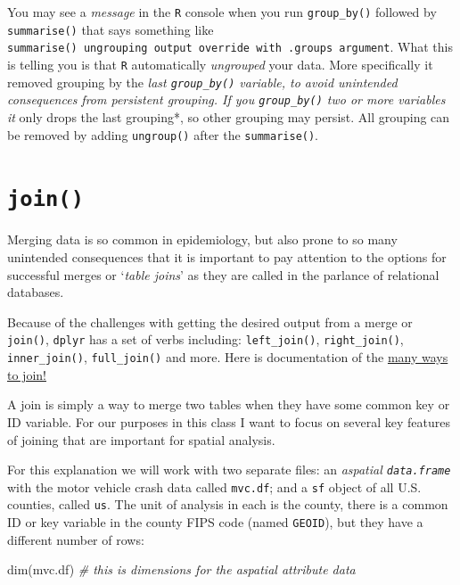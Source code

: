 \documentclass[
]{book}
\newenvironment{Shaded}{\begin{snugshade}}{\end{snugshade}}
\newcommand{\CommentTok}[1]{\textcolor[rgb]{0.56,0.35,0.01}{\textit{#1}}}
\newcommand{\FunctionTok}[1]{\textcolor[rgb]{0.00,0.00,0.00}{#1}}
\newcommand{\NormalTok}[1]{#1}
\newenvironment{rmdnote}[1]
  {
  \begin{itemize}
  \renewcommand{\labelitemi}{
    \raisebox{-.7\height}[0pt][0pt]{
      {\setkeys{Gin}{width=3em,keepaspectratio}\texttt{[image: images/\#1]}}
    }
  }
  \setlength{\fboxsep}{1em}
  \begin{note}
  \item
  }
  {
  \end{note}
  \end{itemize}
  }
\begin{document}
\begin{rmdnote}{note}
You may see a \emph{message} in the \texttt{R} console when you run \texttt{group\_by()} followed by \texttt{summarise()} that says something like \texttt{summarise()\ ungrouping\ output\ override\ with\ .groups\ argument}. What this is telling you is that \texttt{R} automatically \emph{ungrouped} your data. More specifically it removed grouping by the \emph{last \texttt{group\_by()} variable, to avoid unintended consequences from persistent grouping. If you \texttt{group\_by()} two or more variables it }only drops the last grouping*, so other grouping may persist. All grouping can be removed by adding \texttt{ungroup()} after the \texttt{summarise()}.

\end{rmdnote}

\hypertarget{join}{%
\section{\texorpdfstring{\texttt{join()}}{join()}}\label{join}}

Merging data is so common in epidemiology, but also prone to so many unintended consequences that it is important to pay attention to the options for successful merges or `\emph{table joins}' as they are called in the parlance of relational databases.

Because of the challenges with getting the desired output from a merge or \texttt{join()}, \texttt{dplyr} has a set of verbs including: \texttt{left\_join()}, \texttt{right\_join()}, \texttt{inner\_join()}, \texttt{full\_join()} and more. Here is documentation of the \href{https://dplyr.tidyverse.org/reference/join.html}{many ways to join!}

A join is simply a way to merge two tables when they have some common key or ID variable. For our purposes in this class I want to focus on several key features of joining that are important for spatial analysis.

For this explanation we will work with two separate files: an \emph{aspatial \texttt{data.frame}} with the motor vehicle crash data called \texttt{mvc.df}; and a \texttt{sf} object of all U.S. counties, called \texttt{us}. The unit of analysis in each is the county, there is a common ID or key variable in the county FIPS code (named \texttt{GEOID}), but they have a different number of rows:

\begin{Shaded}
\begin{Highlighting}[]
\FunctionTok{dim}\NormalTok{(mvc.df)  }\CommentTok{\# this is dimensions for the aspatial attribute data}
\end{Highlighting}
\end{Shaded}
\end{document}
